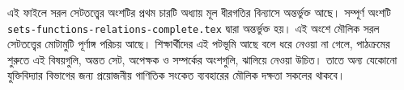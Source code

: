 \documentclass[../../include/open-logic-part]{subfiles}
\begin{document}

\begin{editorial}
এই ফাইলে সরল সেটতত্ত্বের অংশটির প্রথম চারটি অধ্যায় মূল ধীরগতির
বিন্যাসে অন্তর্ভুক্ত আছে। সম্পূর্ণ অংশটি
\verb|sets-functions-relations-complete.tex| দ্বারা অন্তর্ভুক্ত হয়।
এই অংশে মৌলিক সরল সেটতত্ত্বের মোটামুটি পূর্ণাঙ্গ পরিচয় আছে।
শিক্ষার্থীদের এই পটভূমি আছে বলে ধরে নেওয়া না গেলে, পাঠক্রমের শুরুতে
এই বিষয়গুলি, অন্তত সেট, অপেক্ষক ও সম্পর্কের অংশগুলি, ঝালিয়ে নেওয়া
উচিত। তাতে অন্য যেকোনো যুক্তিবিদ্যার বিভাগের জন্য প্রয়োজনীয়
গাণিতিক সংকেত ব্যবহারের মৌলিক দক্ষতা সকলের থাকবে।
\end{editorial}





\OLEndPartHook
\end{document}
